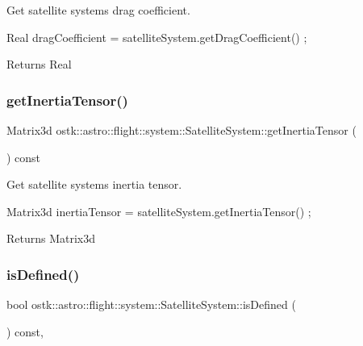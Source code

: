 Get satellite system\textquotesingle{}s drag coefficient. 


\begin{DoxyCode}
Real dragCoefficient = satelliteSystem.getDragCoefficient() ;
\end{DoxyCode}


\begin{DoxyReturn}{Returns}
Real 
\end{DoxyReturn}
\mbox{\label{classostk_1_1astro_1_1flight_1_1system_1_1_satellite_system_a5b4919deec7bbc637878f553542490b2}} 
\subsubsection{\texorpdfstring{get\+Inertia\+Tensor()}{getInertiaTensor()}}
{\footnotesize\ttfamily Matrix3d ostk\+::astro\+::flight\+::system\+::\+Satellite\+System\+::get\+Inertia\+Tensor (\begin{DoxyParamCaption}{ }\end{DoxyParamCaption}) const}



Get satellite system\textquotesingle{}s inertia tensor. 


\begin{DoxyCode}
Matrix3d inertiaTensor = satelliteSystem.getInertiaTensor() ;
\end{DoxyCode}


\begin{DoxyReturn}{Returns}
Matrix3d 
\end{DoxyReturn}
\mbox{\label{classostk_1_1astro_1_1flight_1_1system_1_1_satellite_system_a6d10fc37776cc87a74fe8b7e2ccb9843}} 
\subsubsection{\texorpdfstring{is\+Defined()}{isDefined()}}
{\footnotesize\ttfamily bool ostk\+::astro\+::flight\+::system\+::\+Satellite\+System\+::is\+Defined (\begin{DoxyParamCaption}{ }\end{DoxyParamCaption}) const\hspace{0.3cm}{\ttfamily [override]}, {\ttfamily [virtual]}}



